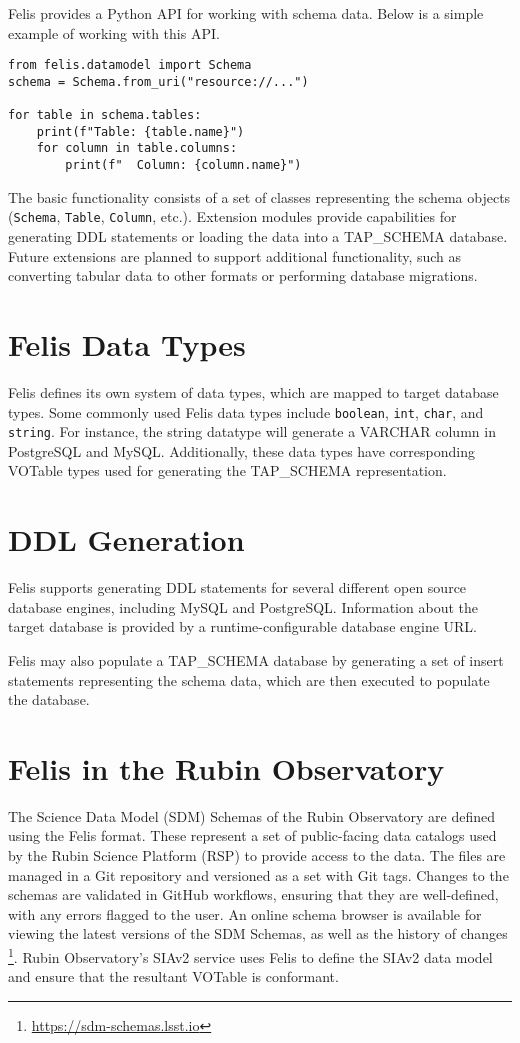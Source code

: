 \documentclass[11pt,twoside]{article}
\begin{document}
Felis provides a Python API for working with schema data.
Below is a simple example of working with this API.
\begin{verbatim}
from felis.datamodel import Schema
schema = Schema.from_uri("resource://...")

for table in schema.tables:
    print(f"Table: {table.name}")
    for column in table.columns:
        print(f"  Column: {column.name}")
\end{verbatim}
The basic functionality consists of a set of classes representing the schema objects (\texttt{Schema}, \texttt{Table}, \texttt{Column}, etc.).
Extension modules provide capabilities for generating DDL statements or loading the data into a TAP\_SCHEMA database.
Future extensions are planned to support additional functionality, such as converting tabular data to other formats or performing database migrations.

\section{Felis Data Types}

Felis defines its own system of data types, which are mapped to target database types.
Some commonly used Felis data types include \texttt{boolean}, \texttt{int}, \texttt{char}, and \texttt{string}.
For instance, the string datatype will generate a VARCHAR column in PostgreSQL and MySQL.
Additionally, these data types have corresponding VOTable types used for generating the TAP\_SCHEMA representation.

\section{DDL Generation}
Felis supports generating DDL statements for several different open source database engines, including MySQL and PostgreSQL.
Information about the target database is provided by a runtime-configurable database engine URL.

Felis may also populate a TAP\_SCHEMA database by generating a set of insert statements representing the schema data, which are then executed to populate the database.

\section{Felis in the Rubin Observatory}

The Science Data Model (SDM) Schemas of the Rubin Observatory \citep[e.g.,][]{LSE-163} are defined using the Felis format.
These represent a set of public-facing data catalogs used by the Rubin Science Platform (RSP) to provide access to the data.
The files are managed in a Git repository and versioned as a set with Git tags.
Changes to the schemas are validated in GitHub workflows, ensuring that they are well-defined, with any errors flagged to the user.
An online schema browser is available for viewing the latest versions of the SDM Schemas, as well as the history of changes \footnote{\url{https://sdm-schemas.lsst.io}}.
Rubin Observatory's SIAv2 service \citep{P920_adassxxxiv} uses Felis to define the SIAv2 data model and ensure that the resultant VOTable is conformant.
\end{document}
